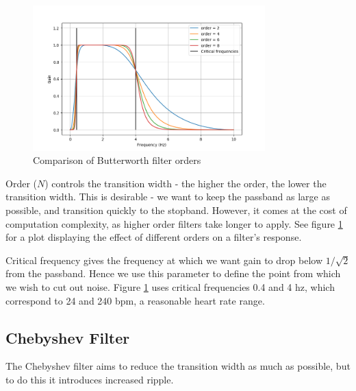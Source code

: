 \documentclass[12pt,a4paper,twoside,openright]{report}
\begin{document}
\begin{figure}[h]
	\centerline{\includegraphics[width=0.8\textwidth]{figs/butter-order-comparison.png}}
\caption{Comparison of Butterworth filter orders}
\label{fig:butterworth-order}
\end{figure}

Order (\(N\)) controls the transition width - the higher the order, the lower
the transition width. This is desirable - we want to keep the passband as
large as possible, and transition quickly to the stopband. However, it comes
at the cost of computation complexity, as higher order filters take longer to
apply. See figure \ref{fig:butterworth-order} for a plot displaying the effect
of different orders on a filter's response.

Critical frequency gives the frequency at which we want gain to drop below
\(1/\sqrt2\) from the passband. Hence we use this parameter to define the
point from which we wish to cut out noise. Figure \ref{fig:butterworth-order}
uses critical frequencies 0.4 and 4 hz, which correspond to 24 and 240 bpm, a
reasonable heart rate range.

\subsection{Chebyshev Filter}

The Chebyshev filter aims to reduce the transition width as much as possible,
but to do this it introduces increased ripple.
\end{document}
